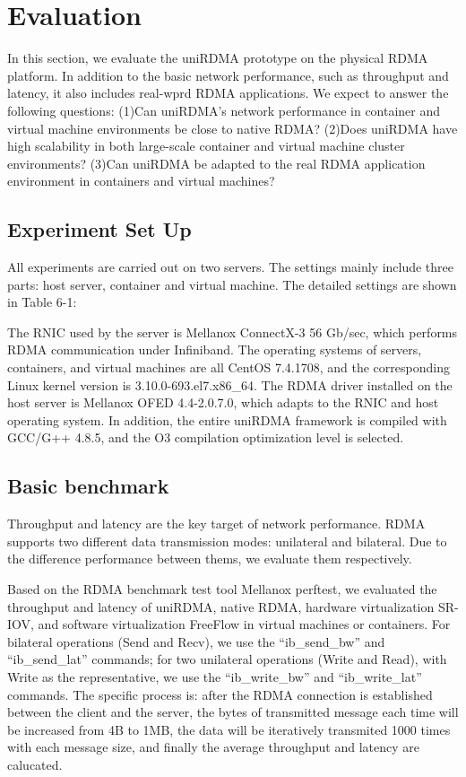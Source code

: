 
\section{Evaluation}
In this section, we evaluate the uniRDMA prototype on the physical RDMA platform. In addition to the basic network performance, such as throughput and latency, it also includes real-wprd RDMA applications. We expect to answer the following questions:
(1)Can uniRDMA's network performance in container and virtual machine environments be close to native RDMA?
(2)Does uniRDMA have high scalability in both large-scale container and virtual machine cluster environments?
(3)Can uniRDMA be adapted to the real RDMA application environment in containers and virtual machines?
	
\subsection{Experiment Set Up}
All experiments are carried out on two servers. The settings mainly include three parts: host server, container and virtual machine. The detailed settings are shown in Table 6-1:

The RNIC used by the server is Mellanox ConnectX-3 56 Gb/sec, which performs RDMA communication under Infiniband. The operating systems of servers, containers, and virtual machines are all CentOS 7.4.1708, and the corresponding Linux kernel version is 3.10.0-693.el7.x86\_64. The RDMA driver installed on the host server is Mellanox OFED 4.4-2.0.7.0, which adapts to the RNIC and host operating system. In addition, the entire uniRDMA framework is compiled with GCC/G++ 4.8.5, and the O3 compilation optimization level is selected.

\subsection{Basic benchmark}
Throughput and latency are the key target of network performance. RDMA supports two different data transmission modes: unilateral and bilateral. Due to the difference performance between thems, we evaluate them respectively.

Based on the RDMA benchmark test tool Mellanox perftest, we evaluated the throughput and latency of uniRDMA, native RDMA, hardware virtualization SR-IOV, and software virtualization FreeFlow in virtual machines or containers. For bilateral operations (Send and Recv), we use the ``ib\_send\_bw'' and ``ib\_send\_lat'' commands; for two unilateral operations (Write and Read), with Write as the representative, we use the ``ib\_write\_bw'' and ``ib\_write\_lat'' commands. The specific process is: after the RDMA connection is established between the client and the server, the bytes of  transmitted message each time will be increased from 4B to 1MB, the data will be iteratively transmited 1000 times with each message size, and finally the average throughput and latency are calucated.

